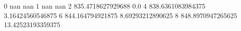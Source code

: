 0 nan nan
1 nan nan
2 835.4718627929688 0.0
4 838.6361083984375 3.16424560546875
6 844.164794921875 8.69293212890625
8 848.8970947265625 13.42523193359375
